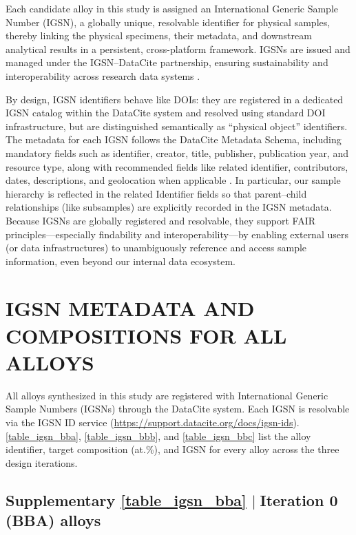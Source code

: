 \documentclass[final,5p,times,twocolumn]{elsarticle}
\begin{document}
Each candidate alloy in this study is assigned an International Generic Sample Number (IGSN), a globally unique, resolvable identifier for physical samples, thereby linking the physical specimens, their metadata, and downstream analytical results in a persistent, cross-platform framework. IGSNs are issued and managed under the IGSN--DataCite partnership, ensuring sustainability and interoperability across research data systems \cite{datacite-igsn-ids}.

By design, IGSN identifiers behave like DOIs: they are registered in a dedicated IGSN catalog within the DataCite system and resolved using standard DOI infrastructure, but are distinguished semantically as ``physical object'' identifiers. The metadata for each IGSN follows the DataCite Metadata Schema, including mandatory fields such as identifier, creator, title, publisher, publication year, and resource type, along with recommended fields like related identifier, contributors, dates, descriptions, and geolocation when applicable \cite{igsn-metadata-schema}. In particular, our sample hierarchy is reflected in the related Identifier fields so that parent--child relationships (like subsamples) are explicitly recorded in the IGSN metadata. Because IGSNs are globally registered and resolvable, they support FAIR principles---especially findability and interoperability---by enabling external users (or data infrastructures) to unambiguously reference and access sample information, even beyond our internal data ecosystem.


\section{IGSN METADATA AND COMPOSITIONS FOR ALL ALLOYS}
\label{s1_igsn_compositions}

All alloys synthesized in this study are registered with International Generic Sample Numbers (IGSNs) through the DataCite system. Each IGSN is resolvable via the IGSN ID service (\url{https://support.datacite.org/docs/igsn-ids}). \autoref{table_igsn_bba}, \autoref{table_igsn_bbb}, and \autoref{table_igsn_bbc} list the alloy identifier, target composition (at.\%), and IGSN for every alloy across the three design iterations.

\cleardoublepage
\onecolumn
\subsection{\texorpdfstring{\textbf{Supplementary \autoref{table_igsn_bba}} \texorpdfstring{$\mid\;$}{Lg}Iteration 0 (BBA) alloys}{Supplementary Table -- Iteration 0 (BBA) alloys}}
\label{s1_igsn_bba}
\vspace{-1em}
\end{document}
